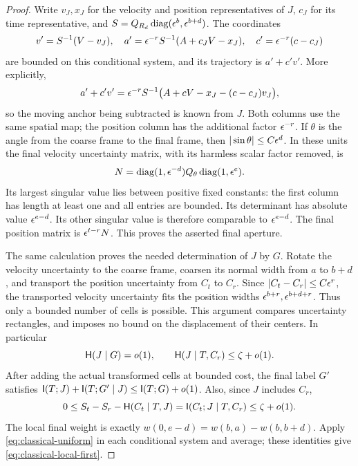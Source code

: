 \begin{proof}
Write $v_J,x_J$ for the velocity and position representatives of $J$,
$c_J$ for its time representative, and
$S=Q_{R_d}\operatorname{diag}(\epsilon^b,\epsilon^{b+d})$.  The coordinates
\[
 v'=S^{-1}(V-v_J),\quad
 a'=\epsilon^{-r}S^{-1}(A+c_JV-x_J),\quad
 c'=\epsilon^{-r}(c-c_J)
\]
are bounded on this conditional system, and its trajectory is
$a'+c'v'$.  More explicitly,
\[
 a'+c'v'=\epsilon^{-r}S^{-1}
       \bigl(A+cV-x_J-(c-c_J)v_J\bigr),
\]
so the moving anchor being subtracted is known from $J$.  Both columns
use the same spatial map; the position column
has the additional factor $\epsilon^{-r}$.  If $\theta$ is the angle from
the coarse frame to the final frame, then
$|\sin\theta|\le C\epsilon^d$.  In these units the final velocity
uncertainty matrix, with its harmless scalar factor removed, is
\[
 N=\operatorname{diag}(1,\epsilon^{-d})
       Q_\theta\operatorname{diag}(1,\epsilon^e).
\]
Its largest singular value lies between positive fixed constants:
the first column has length at least one and all entries are bounded.
Its determinant has absolute value $\epsilon^{e-d}$.  Its other singular
value is therefore comparable to $\epsilon^{e-d}$.  The final position
matrix is $\epsilon^{t-r}N$.  This proves the asserted final aperture.

The same calculation proves the needed determination of $J$ by $G$.
Rotate the velocity uncertainty to the coarse frame, coarsen its normal
width from $a$ to $b+d$, and transport the position uncertainty from
$C_t$ to $C_r$.  Since $|C_t-C_r|\le C\epsilon^r$, the transported velocity
uncertainty fits the position widths $\epsilon^{b+r},\epsilon^{b+d+r}$.
Thus only a bounded number of cells is possible.  This argument compares
uncertainty rectangles, and imposes no bound on the displacement of
their centers.  In particular
\[
 \mathsf H(J\mid G)=o(1),\qquad
 \mathsf H(J\mid T,C_r)\le\zeta+o(1).
\]
After adding the actual transformed cells at bounded cost, the final
label $G'$ satisfies
$\mathsf I(T;J)+\mathsf I(T;G'\mid J)\le\mathsf I(T;G)+o(1)$.
Also, since $J$ includes $C_r$,
\[
 0\le S_t-S_r-\mathsf H(C_t\mid T,J)
      =\mathsf I(C_t;J\mid T,C_r)\le\zeta+o(1).
\]
The local final weight is exactly
$w(0,e-d)=w(b,a)-w(b,b+d)$.  Apply
\eqref{eq:classical-uniform} in each conditional system and average;
these identities give \eqref{eq:classical-local-first}.


\end{proof}
